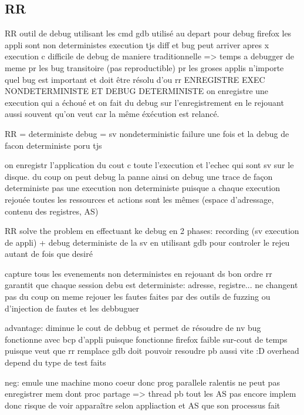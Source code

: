 \subsection{RR}

\citep{RR}
RR outil de debug utilisant les cmd gdb utilisé au depart pour debug firefox
les appli sont non deterministes execution tjs diff et bug peut arriver apres x execution c difficile de debug de maniere traditionnelle => temps a debugger de meme pr les bug transitoire (pas reproductible) pr les groses applis n'importe quel bug est important et doit être résolu d'ou rr
ENREGISTRE EXEC NONDETERMINISTE ET DEBUG DETERMINISTE
on enregistre une execution qui a échoué et on fait du debug sur l'enregistrement en le rejouant aussi souvent qu'on veut car la même éxécution est relancé.

RR = deterministe debug = sv nondeterministic failure une fois et la debug de facon deterministe poru tjs

on enregistr l'application du cout c toute l'execution et l'echec qui sont sv sur le disque.  du coup on peut debug la panne
ainsi on debug une trace de façon deterministe pas une execution non deterministe puisque a chaque execution rejouée toutes les ressources et actions sont les mêmes (espace d'adressage, contenu des registres, AS)

RR solve the problem en effectuant ke debug en 2 phases: recording (sv execution de appli) + debug deterministe de la sv en utilisant gdb pour controler le rejeu autant de fois que desiré

capture tous les evenements non deterministes
en rejouant ds bon ordre rr garantit que chaque session debu est deterministe: adresse, registre... ne changent pas
du coup on meme rejouer les fautes faites par des outils de fuzzing ou d'injection de fautes et les debbuguer

advantage:
diminue le cout de debbug et permet de résoudre de nv bug
fonctionne avec bcp d'appli puisque fonctionne firefox
faible sur-cout de temps puisque veut que rr remplace gdb doit pouvoir resoudre pb aussi vite :D overhead depend du type de test faits

neg:
emule une machine mono coeur donc prog parallele ralentis
ne peut pas enregistrer mem dont proc partage => thread pb
tout les AS pas encore implem donc risque de voir apparaître selon appliaction et AS que son processus fait
